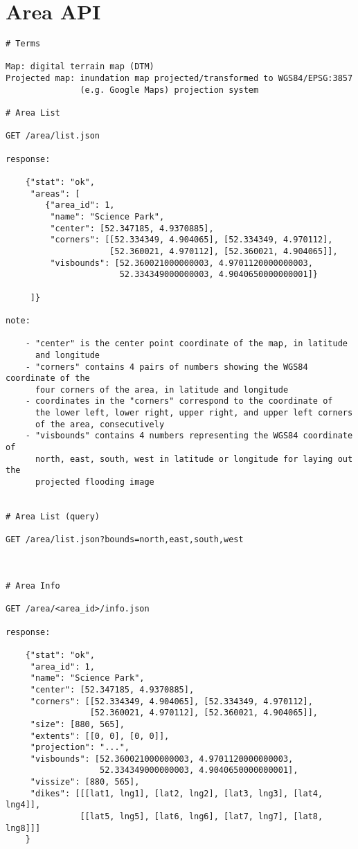 \section{Area API}
\label{sec: area_api}
\begin{lstlisting}
# Terms

Map: digital terrain map (DTM)
Projected map: inundation map projected/transformed to WGS84/EPSG:3857
               (e.g. Google Maps) projection system

# Area List

GET /area/list.json

response:

    {"stat": "ok",
     "areas": [
        {"area_id": 1,
         "name": "Science Park",
         "center": [52.347185, 4.9370885],
         "corners": [[52.334349, 4.904065], [52.334349, 4.970112],
                     [52.360021, 4.970112], [52.360021, 4.904065]],
         "visbounds": [52.360021000000003, 4.9701120000000003,
                       52.334349000000003, 4.9040650000000001]}

     ]}

note:

    - "center" is the center point coordinate of the map, in latitude
      and longitude
    - "corners" contains 4 pairs of numbers showing the WGS84 coordinate of the
      four corners of the area, in latitude and longitude
    - coordinates in the "corners" correspond to the coordinate of
      the lower left, lower right, upper right, and upper left corners
      of the area, consecutively
    - "visbounds" contains 4 numbers representing the WGS84 coordinate of
      north, east, south, west in latitude or longitude for laying out the
      projected flooding image


# Area List (query)

GET /area/list.json?bounds=north,east,south,west



# Area Info

GET /area/<area_id>/info.json

response:

    {"stat": "ok",
     "area_id": 1,
     "name": "Science Park",
     "center": [52.347185, 4.9370885],
     "corners": [[52.334349, 4.904065], [52.334349, 4.970112],
                 [52.360021, 4.970112], [52.360021, 4.904065]],
     "size": [880, 565],
     "extents": [[0, 0], [0, 0]],
     "projection": "...",
     "visbounds": [52.360021000000003, 4.9701120000000003,
                   52.334349000000003, 4.9040650000000001],
     "vissize": [880, 565],
     "dikes": [[[lat1, lng1], [lat2, lng2], [lat3, lng3], [lat4, lng4]],
               [[lat5, lng5], [lat6, lng6], [lat7, lng7], [lat8, lng8]]]
    }


\end{lstlisting}
